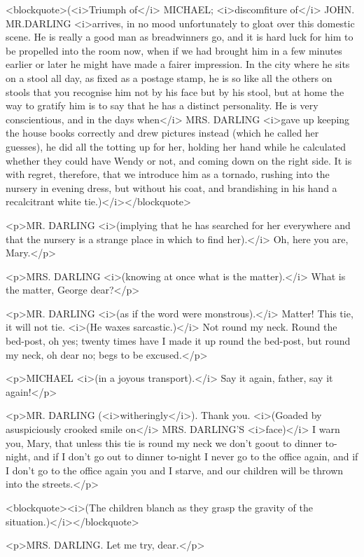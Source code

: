 <blockquote>(<i>Triumph of</i> MICHAEL; <i>discomfiture of</i> JOHN.
MR.DARLING <i>arrives, in no mood unfortunately to gloat over this
domestic scene. He is really a good man as breadwinners go, and it is
hard luck for him to be propelled into the room now, when if we had
brought him in a few minutes earlier or later he might have made a
fairer impression. In the city where he sits on a stool all day, as
fixed as a postage stamp, he is so like all the others on stools that
you recognise him not by his face but by his stool, but at home the
way to gratify him is to say that he has a distinct personality. He
is very conscientious, and in the days when</i> MRS. DARLING <i>gave
up keeping the house books correctly and drew pictures instead (which
he called her guesses), he did all the totting up for her, holding
her hand while he calculated whether they could have Wendy or not,
and coming down on the right side. It is with regret, therefore, that
we introduce him as a tornado, rushing into the nursery in evening
dress, but without his coat, and brandishing in his hand a
recalcitrant white tie.)</i></blockquote>

<p>MR. DARLING <i>(implying that he has searched for her everywhere
and that the nursery is a strange place in which to find her).</i>
Oh, here you are, Mary.</p>

<p>MRS. DARLING <i>(knowing at once what is the matter).</i> What is
the matter, George dear?</p>

<p>MR. DARLING <i>(as if the word were monstrous).</i> Matter! This
tie, it will not tie. <i>(He waxes sarcastic.)</i> Not round my neck.
Round the bed-post, oh yes; twenty times have I made it up round the
bed-post, but round my neck, oh dear no; begs to be excused.</p>

<p>MICHAEL <i>(in a joyous transport).</i> Say it again, father, say
it again!</p>

<p>MR. DARLING (<i>witheringly</i>). Thank you. <i>(Goaded by
asuspiciously crooked smile on</i> MRS. DARLING'S <i>face)</i> I warn
you, Mary, that unless this tie is round my neck we don't goout to
dinner to-night, and if I don't go out to dinner to-night I never go
to the office again, and if I don't go to the office again you and I
starve, and our children will be thrown into the streets.</p>

<blockquote><i>(The children blanch as they grasp the gravity of the
situation.)</i></blockquote>

<p>MRS. DARLING. Let me try, dear.</p>


